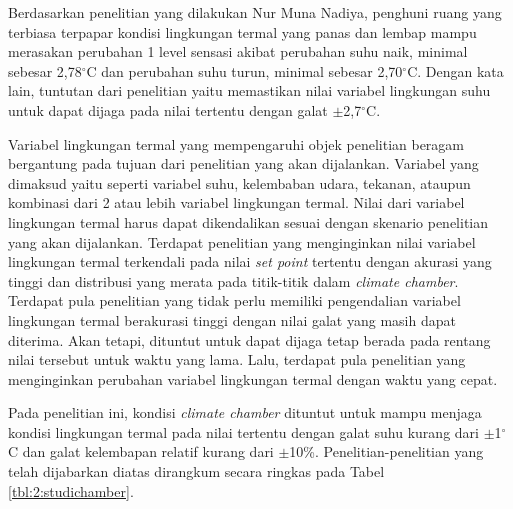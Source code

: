 Berdasarkan penelitian yang dilakukan Nur Muna Nadiya\cite{skripsiMuna}, penghuni ruang yang terbiasa terpapar kondisi lingkungan termal yang panas dan lembap mampu merasakan perubahan 1 level sensasi akibat perubahan suhu naik, minimal sebesar 2,78$^{\circ}$C dan perubahan suhu turun, minimal sebesar 2,70$^{\circ}$C. Dengan kata lain, tuntutan dari penelitian yaitu memastikan nilai variabel lingkungan suhu untuk dapat dijaga pada nilai tertentu dengan galat $\pm$2,7$^{\circ}$C. 

Variabel lingkungan termal yang mempengaruhi objek penelitian beragam bergantung pada tujuan dari penelitian yang akan dijalankan. Variabel yang dimaksud yaitu seperti variabel suhu, kelembaban udara, tekanan, ataupun kombinasi dari 2 atau lebih variabel lingkungan termal. Nilai dari variabel lingkungan termal harus dapat dikendalikan sesuai dengan skenario penelitian yang akan dijalankan. Terdapat penelitian yang menginginkan nilai variabel lingkungan termal terkendali pada nilai \textit{set point} tertentu dengan akurasi yang tinggi dan distribusi yang merata pada titik-titik dalam \textit{climate chamber}. Terdapat pula penelitian yang tidak perlu memiliki pengendalian variabel lingkungan termal berakurasi tinggi dengan nilai galat yang masih dapat diterima. Akan tetapi, dituntut untuk dapat dijaga tetap berada pada rentang nilai tersebut untuk waktu yang lama. Lalu, terdapat pula penelitian yang menginginkan perubahan variabel lingkungan termal dengan waktu yang cepat. 

Pada penelitian ini, kondisi \textit{climate chamber} dituntut untuk mampu menjaga kondisi lingkungan termal pada nilai tertentu dengan galat suhu kurang dari $\pm$1$^{\circ}$C dan galat kelembapan relatif kurang dari $\pm$10\%. Penelitian-penelitian yang telah dijabarkan diatas dirangkum secara ringkas pada Tabel \ref{tbl:2:studichamber}. 

